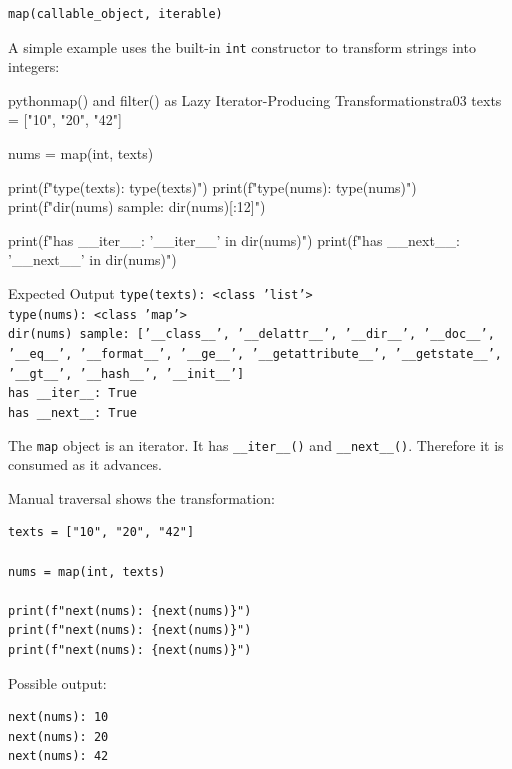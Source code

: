 \documentclass[a4paper,twoside]{report}
\begin{document}
\begin{verbatim}
map(callable_object, iterable)
\end{verbatim}

A simple example uses the built-in \texttt{int} constructor to transform strings into integers:

\begin{codebox}[]{python}{map() and filter() as Lazy Iterator-Producing Transformations}{tra03}
texts = ["10", "20", "42"]

nums = map(int, texts)

print(f"type(texts): {type(texts)}")
print(f"type(nums): {type(nums)}")
print(f"dir(nums) sample: {dir(nums)[:12]}")

print(f"has __iter__: {'__iter__' in dir(nums)}")
print(f"has __next__: {'__next__' in dir(nums)}")
\end{codebox}


\begin{iobox}{Expected Output}
\texttt{type(texts): <class 'list'>} \\
\texttt{type(nums): <class 'map'>} \\
\texttt{dir(nums) sample: ['\_\_class\_\_', '\_\_delattr\_\_', '\_\_dir\_\_', '\_\_doc\_\_',} \\
\texttt{'\_\_eq\_\_', '\_\_format\_\_', '\_\_ge\_\_', '\_\_getattribute\_\_', '\_\_getstate\_\_',} \\
\texttt{'\_\_gt\_\_', '\_\_hash\_\_', '\_\_init\_\_']} \\
\texttt{has \_\_iter\_\_: True} \\
\texttt{has \_\_next\_\_: True} \\
\end{iobox}


The \texttt{map} object is an iterator. It has \texttt{\_\_iter\_\_()} and \texttt{\_\_next\_\_()}. Therefore it is consumed as it advances.

Manual traversal shows the transformation:

\begin{verbatim}
texts = ["10", "20", "42"]

nums = map(int, texts)

print(f"next(nums): {next(nums)}")
print(f"next(nums): {next(nums)}")
print(f"next(nums): {next(nums)}")
\end{verbatim}

Possible output:

\begin{verbatim}
next(nums): 10
next(nums): 20
next(nums): 42
\end{verbatim}
\end{document}
